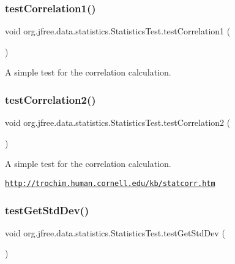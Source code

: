 \subsubsection{\texorpdfstring{test\+Correlation1()}{testCorrelation1()}}
{\footnotesize\ttfamily void org.\+jfree.\+data.\+statistics.\+Statistics\+Test.\+test\+Correlation1 (\begin{DoxyParamCaption}{ }\end{DoxyParamCaption})}

A simple test for the correlation calculation. \mbox{\label{classorg_1_1jfree_1_1data_1_1statistics_1_1_statistics_test_ae7923f4de3918523314715339ab2c577}} 
\subsubsection{\texorpdfstring{test\+Correlation2()}{testCorrelation2()}}
{\footnotesize\ttfamily void org.\+jfree.\+data.\+statistics.\+Statistics\+Test.\+test\+Correlation2 (\begin{DoxyParamCaption}{ }\end{DoxyParamCaption})}

A simple test for the correlation calculation.

\href{http://trochim.human.cornell.edu/kb/statcorr.htm}{\tt http\+://trochim.\+human.\+cornell.\+edu/kb/statcorr.\+htm} \mbox{\label{classorg_1_1jfree_1_1data_1_1statistics_1_1_statistics_test_a2531f8b95459797c0b383c824268d476}} 
\subsubsection{\texorpdfstring{test\+Get\+Std\+Dev()}{testGetStdDev()}}
{\footnotesize\ttfamily void org.\+jfree.\+data.\+statistics.\+Statistics\+Test.\+test\+Get\+Std\+Dev (\begin{DoxyParamCaption}{ }\end{DoxyParamCaption})}

